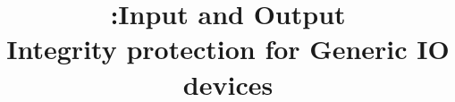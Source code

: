 

\newif\ifpaper
\papertrue


\newif\ifdesperatetime

\graphicspath{{images/}}


\title{\name:Input and Output\\ Integrity protection for Generic IO devices}

\iffalse
\author{\IEEEauthorblockN{Aritra Dhar}
\IEEEauthorblockA{ETH Z{\"u}rich\\
aritra.dhar@inf.ethz.ch}
}
\fi
\maketitle
\begin{abstract}

\end{abstract}

\IEEEpeerreviewmaketitle








%  
%


